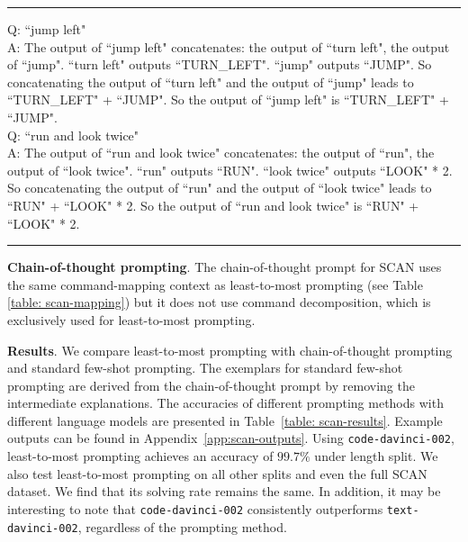 \documentclass{article}
\begin{document}
\begin{table}[h!]
\centering
\hrule
\parbox{0.97\textwidth}{
\vspace{5pt}
Q: ``jump left"\\
A: The output of ``jump left" concatenates: the output of ``turn left", the output of ``jump". ``turn left" outputs ``TURN\_LEFT". ``jump" outputs ``JUMP". So concatenating the output of ``turn left" and the output of ``jump" leads to ``TURN\_LEFT" + ``JUMP". So the output of ``jump left" is ``TURN\_LEFT" + ``JUMP".\\
 
Q: ``run and look twice"\\
A: The output of ``run and look twice" concatenates: the output of ``run", the output of ``look twice". ``run" outputs ``RUN". ``look twice" outputs ``LOOK" * 2. So concatenating the output of ``run" and the output of ``look twice" leads to ``RUN" + ``LOOK" * 2. So the output of ``run and look twice" is ``RUN" + ``LOOK" * 2.

\vspace{3pt}
}
\hrule
\vspace{5pt}
\caption {Two exemplars taken from the least-to-most / chain-of-thought prompt for mapping commands to action sequences.  Python expressions are used as intermediate representations.}
\label{table: scan-mapping}
\end{table}



\textbf{Chain-of-thought prompting}. The chain-of-thought prompt for SCAN uses the same command-mapping context as least-to-most prompting (see Table \ref{table: scan-mapping}) but it does not use command decomposition, which is exclusively used for least-to-most prompting.

\textbf{Results}. We compare least-to-most prompting with chain-of-thought prompting and standard few-shot prompting. The exemplars for standard few-shot prompting are derived from the chain-of-thought prompt by removing the intermediate explanations.  The accuracies of different prompting methods with different language models are presented in Table~\ref{table: scan-results}. Example outputs can be found in Appendix~\ref{app:scan-outputs}. Using \texttt{code-davinci-002}, least-to-most prompting achieves an accuracy of $99.7\% $ under length split.
 We also test least-to-most prompting on all other splits and even the full SCAN dataset. We find that its solving rate remains the same. In addition, it may be interesting to note that \texttt{code-davinci-002} consistently outperforms \texttt{text-davinci-002}, regardless of the prompting method.  
\end{document}
